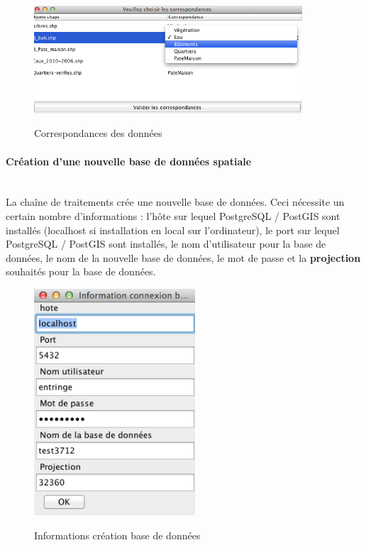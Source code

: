 \begin{figure}[H]
\begin{center}
\includegraphics[width=10cm]{Chaine3}\\
\caption{\label{Chaine3} Correspondances des données}
\end{center}
\end{figure}

\paragraph{Création d'une nouvelle base de données spatiale\\\\}

La chaîne de traitements crée une nouvelle base de données. Ceci nécessite un certain nombre d'informations : l'hôte sur lequel PostgreSQL / PostGIS sont installés (localhost si installation en local sur l'ordinateur), le port sur lequel PostgreSQL / PostGIS sont installés, le nom d'utilisateur pour la base de données, le nom de la nouvelle base de données, le mot de passe et la \textbf{projection} souhaités pour la base de données.\\

\begin{figure}[H]
\begin{center}

\includegraphics[width=6cm]{Chaine2}\\
\caption{\label{Chaine2} Informations création base de données}
\end{center}

\end{figure}





